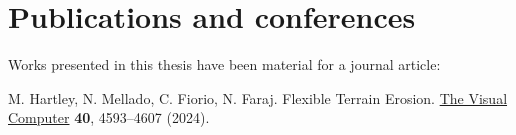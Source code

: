 




\newpage
\section*{Publications and conferences}
Works presented in this thesis have been material for a journal article:
\begin{Itemize}
    \Item{} M. Hartley, N. Mellado, C. Fiorio, N. Faraj. Flexible Terrain Erosion. \ul{The Visual Computer} \textbf{40}, 4593--4607 (2024).
\end{Itemize}

